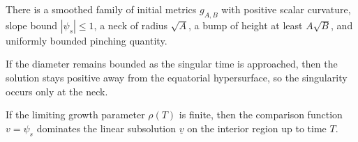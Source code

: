 \begin{lemma}
\label{ch02-lem-neckpinch-initial-family}
There is a smoothed family of initial metrics \(g_{A,B}\) with positive scalar
curvature, slope bound \(|\psi_s|\le 1\), a neck of radius \(\sqrt A\), a bump
of height at least \(A\sqrt B\), and uniformly bounded pinching quantity.
\end{lemma}

\begin{proposition}
\label{ch02-prop-single-point-pinching}
If the diameter remains bounded as the singular time is approached, then the
solution stays positive away from the equatorial hypersurface, so the
singularity occurs only at the neck.
\end{proposition}

\begin{lemma}
\label{ch02-lem-single-point-subsolution}
If the limiting growth parameter \(\rho(T)\) is finite, then the comparison
function \(v=\psi_s\) dominates the linear subsolution \(\underline v\) on the
interior region up to time \(T\).
\end{lemma}
